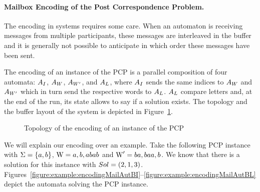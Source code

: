 \paragraph{Mailbox Encoding of the Post Correspondence Problem.}
The encoding in \Mailbox systems requires some care.
When an automaton is receiving messages from multiple participants, these messages are interleaved in the buffer and it is generally not possible to anticipate in which order these messages have been sent.

The encoding of an instance \pcpinstance{} of the PCP  is a parallel composition of four automata: $A_{I}$, $A_{W}$, $A_{W'}$, and $A_{L}$, where $A_{I}$ sends the same indices to $A_{W}$ and $A_{W'}$ which in turn send the respective words to $A_{L}$. $A_{L}$ compare letters and, at the end of the run, its state allows to say if a solution exists. The topology and the buffer layout of the system is depicted in Figure~\ref{figure:topologyEncodeMail}. 

\begin{figure}[t]
	\centering
	\scalebox{0.9}{}
	\caption{Topology of the encoding of an instance  \pcpinstance{} of the PCP} 
	\label{figure:topologyEncodeMail}
\end{figure}

We will explain our encoding over an example. Take the following PCP instance with  $\Sigma = \{a, b\}$,  $\text{W} = a, b, abab$ and $\text{W}' = ba, baa, b$. We know that there is a solution for this instance with $Sol = (2, 1, 3)$. 
 Figures~\ref{figure:example:encodingMailAutBI}--\ref{figure:example:encodingMailAutBL} %
depict the automata solving the PCP instance.


%		
%		
%		


